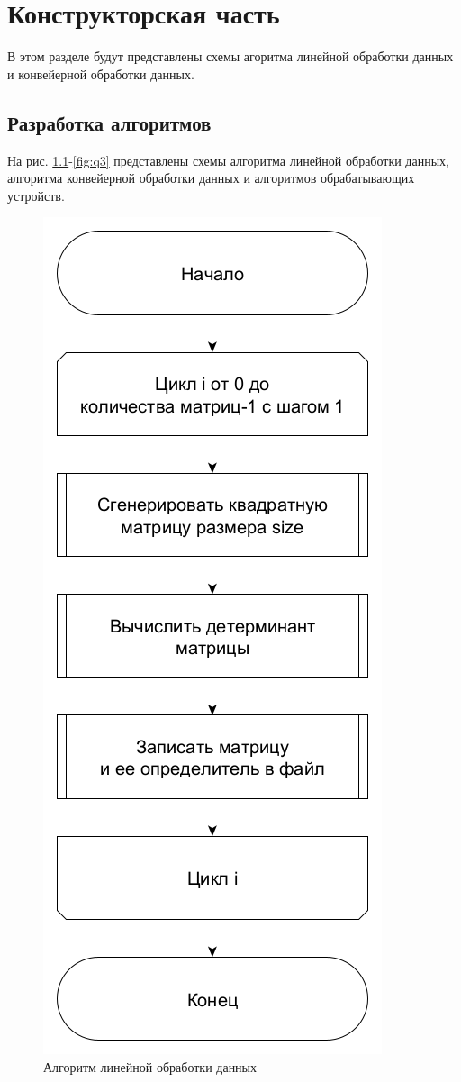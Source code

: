 \chapter{Конструкторская часть}
\hspace{\parindent}В этом разделе будут представлены схемы агоритма линейной обработки данных и конвейерной обработки данных.

\section{Разработка алгоритмов}
\hspace{\parindent}На рис. \ref{fig:linear}-\ref{fig:q3} представлены схемы алгоритма линейной обработки данных, алгоритма конвейерной обработки данных и алгоритмов обрабатывающих устройств.

\begin{figure}[h]
	\centering
    \includegraphics[height=0.8\textheight]{img/linear.png}
    \caption{Алгоритм линейной обработки данных}
    \label{fig:linear}
\end{figure}
